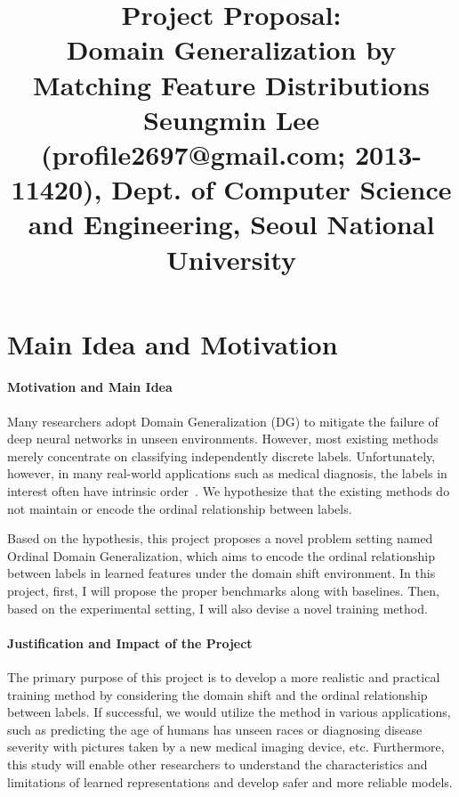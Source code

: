 \documentclass[10pt,twocolumn,letterpaper]{article}
\begin{document}
\title{Project Proposal: \\ Domain Generalization by Matching Feature Distributions \\{\rm {\normalsize Seungmin Lee (profile2697@gmail.com; 2013-11420), Dept. of Computer Science and Engineering, Seoul National University}}} 

\maketitle
\thispagestyle{empty}


\section{Main Idea and Motivation}
\paragraph{Motivation and Main Idea}  Many researchers adopt Domain Generalization (DG) to mitigate the failure of deep neural networks in unseen environments. However, most existing methods merely concentrate on classifying independently discrete labels. Unfortunately, however, in many real-world applications such as medical diagnosis, the labels in interest often have intrinsic order~\cite{RCG}.
We hypothesize that the existing methods do not maintain or encode the ordinal relationship between labels.

Based on the hypothesis, this project proposes a novel problem setting named Ordinal Domain Generalization, which aims to encode the ordinal relationship between labels in learned features under the domain shift environment. In this project, first, I will propose the proper benchmarks along with baselines. Then, based on the experimental setting, I will also devise a novel training method.

\paragraph{Justification and Impact of the Project}
The primary purpose of this project is to develop a more realistic and practical training method by considering the domain shift and the ordinal relationship between labels. If successful, we would utilize the method in various applications, such as predicting the age of humans has unseen races or diagnosing disease severity with pictures taken by a new medical imaging device, etc. Furthermore, this study will enable other researchers to understand the characteristics and limitations of learned representations and develop safer and more reliable models.
\end{document}
